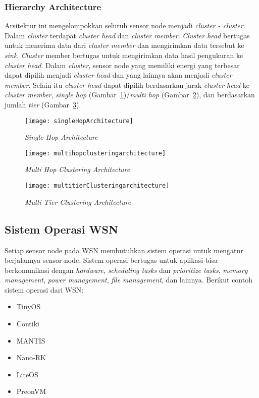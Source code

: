 \subsubsection{Hierarchy Architecture}
\label{subsubsec:hierarchyArch}
Arsitektur ini mengelompokkan seluruh sensor node menjadi {\it cluster - cluster}. Dalam {\it cluster} terdapat {\it cluster head} dan {\it cluster member}. {\it Cluster head} bertugas untuk menerima data dari {\it cluster member} dan mengirimkan data tersebut ke {\it sink}. {\it Cluster} member bertugas untuk mengirimkan data hasil pengukuran ke {\it cluster head}. Dalam {\it cluster}, sensor node yang memiliki energi yang terbesar dapat dipilih menjadi {\it cluster head} dan yang lainnya akan menjadi {\it cluster member}. Selain itu {\it cluster head} dapat dipilih berdasarkan jarak {\it cluster head} ke {\it cluster member}, {\it single hop} (Gambar~\ref{fig:singleHopArchitecture})/{\it multi hop} (Gambar~\ref{fig:multihopclusteringarchitecture}), dan berdasarkan jumlah {\it tier} (Gambar~\ref{fig:multitierClusteringarchitecture}).
\begin{figure} [H]
	\centering  
	\texttt{[image: singleHopArchitecture]}  
	\caption[{\it Single Hop Architecture}]{{\it Single Hop Architecture}} 
	\label{fig:singleHopArchitecture} 
\end{figure} 
\begin{figure} [H]
	\centering  
	\texttt{[image: multihopclusteringarchitecture]}  
	\caption[{\it Multi Hop Clustering Architecture}]{{\it Multi Hop Clustering Architecture}} 
	\label{fig:multihopclusteringarchitecture} 
\end{figure} 
\begin{figure} [H]
	\centering  
	\texttt{[image: multitierClusteringarchitecture]}  
	\caption[{\it Multi Tier Clustering Architecture}]{{\it Multi Tier Clustering Architecture}} 
	\label{fig:multitierClusteringarchitecture} 
\end{figure} 

\subsection{Sistem Operasi WSN \cite{fundamentals:0:fundamental}}
Setiap sensor node pada WSN membutuhkan sistem operasi untuk mengatur berjalannya sensor node. Sistem operasi bertugas untuk aplikasi bisa berkomunikasi dengan {\it hardware}, {\it scheduling tasks} dan {\it prioritize tasks}, {\it memory management}, {\it power management}, {\it file management}, dan lainnya. Berikut contoh sistem operasi dari WSN: 
\begin{itemize}
	\item TinyOS
	\item Contiki
	\item MANTIS
	\item Nano-RK
	\item LiteOS
	\item PreonVM
\end{itemize}  

